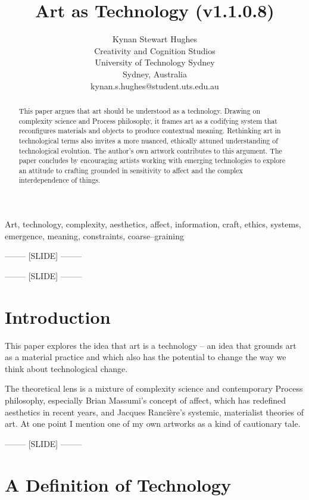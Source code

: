 \documentclass[letter:wpaper]{article}
\title{Art as Technology (v1.1.0.8)}
\author{Kynan Stewart Hughes\\
Creativity and Cognition Studios\\
University of Technology Sydney\\
Sydney, Australia\\
kynan.s.hughes@student.uts.edu.au\\
\newline
\newline
}
\begin{document}
 
\maketitle
\begin{abstract}
    This paper argues that art should be understood as a technology. Drawing on complexity science and Process philosophy, it frames art as a codifying system that reconfigures materials and objects to produce contextual meaning. Rethinking art in technological terms also invites a more nuanced, ethically attuned understanding of technological evolution. The author’s own artwork contributes to this argument. The paper concludes by encouraging artists working with emerging technologies to explore an attitude to crafting grounded in sensitivity to affect and the complex interdependence of things.
\end{abstract}


Art, technology, complexity, aesthetics, affect, information, craft, ethics, systems, emergence, meaning, constraints, coarse–graining

-------- [SLIDE] --------

-------- [SLIDE] --------

\section{Introduction}

    This paper explores the idea that art is a technology \citep[pp.74–75]{SauvagnarguesArtmchns2016} \citep{GellThTchnlgyOfEnchntmnt1992} \citep[p.202]{OSullivanFrmAsthtcsToThAbstrctMchn2010} -- an idea that grounds art as a material practice and which also has the potential to change the way we think about technological change. 
    
    The theoretical lens is a mixture of complexity science and contemporary Process philosophy, especially Brian Massumi's concept of affect, which has redefined aesthetics in recent years, and Jacques Rancière's systemic, materialist theories of art. At one point I mention one of my own artworks as a kind of cautionary tale.

-------- [SLIDE] --------

\section{A Definition of Technology} 
\end{document}
